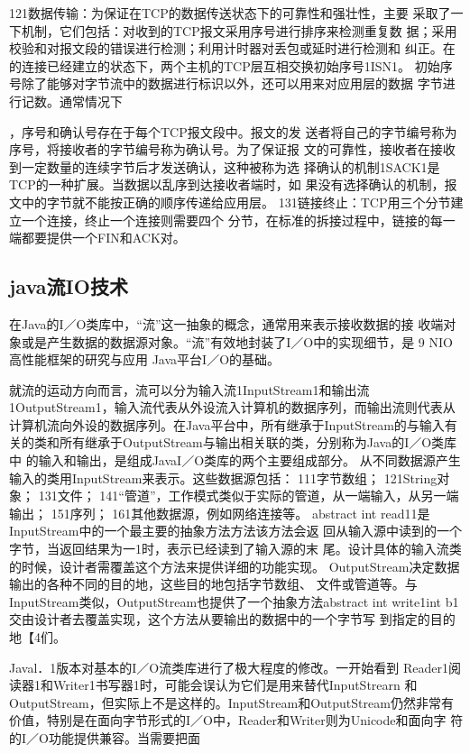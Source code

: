 121数据传输：为保证在TCP的数据传送状态下的可靠性和强壮性，主要
采取了一下机制，它们包括：对收到的TCP报文采用序号进行排序来检测重复数
据；采用校验和对报文段的错误进行检测；利用计时器对丢包或延时进行检测和
纠正。在的连接已经建立的状态下，两个主机的TCP层互相交换初始序号1ISN1。
初始序号除了能够对字节流中的数据进行标识以外，还可以用来对应用层的数据
字节进行记数。通常情况下

，序号和确认号存在于每个TCP报文段中。报文的发
送者将自己的字节编号称为序号，将接收者的字节编号称为确认号。为了保证报
文的可靠性，接收者在接收到一定数量的连续字节后才发送确认，这种被称为选
择确认的机制1SACK1是TCP的一种扩展。当数据以乱序到达接收者端时，如
果没有选择确认的机制，报文中的字节就不能按正确的顺序传递给应用层。
131链接终止：TCP用三个分节建立一个连接，终止一个连接则需要四个
分节，在标准的拆接过程中，链接的每一端都要提供一个FIN和ACK对。
\subsection{java流IO技术}
在Java的I／O类库中，“流”这一抽象的概念，通常用来表示接收数据的接
收端对象或是产生数据的数据源对象。“流”有效地封装了I／O中的实现细节，是
9
NIO高性能框架的研究与应用
Java平台I／O的基础。

就流的运动方向而言，流可以分为输入流1InputStream1和输出流
1OutputStream1，输入流代表从外设流入计算机的数据序列，而输出流则代表从
计算机流向外设的数据序列。在Java平台中，所有继承于InputStream的与输入有
关的类和所有继承于OutputStream与输出相关联的类，分别称为Java的I／O类库中
的输入和输出，是组成JavaI／O类库的两个主要组成部分。
从不同数据源产生输入的类用InputStream来表示。这些数据源包括：
111字节数组；
121String对象；
131文件；
141“管道”，工作模式类似于实际的管道，从一端输入，从另一端输出；
151序列；
161其他数据源，例如网络连接等。
abstract int read11是InputStream中的一个最主要的抽象方法方法该方法会返
回从输入源中读到的一个字节，当返回结果为一1时，表示已经读到了输入源的末
尾。设计具体的输入流类的时候，设计者需覆盖这个方法来提供详细的功能实现。
OutputStream决定数据输出的各种不同的目的地，这些目的地包括字节数组、
文件或管道等。与InputStream类似，OutputStream也提供了一个抽象方法abstract
int write1int b1交由设计者去覆盖实现，这个方法从要输出的数据中的一个字节写
到指定的目的地【4们。

Javal．1版本对基本的I／O流类库进行了极大程度的修改。一开始看到
Reader1阅读器1和Writer1书写器1时，可能会误认为它们是用来替代InputStrearn
和OutputStream，但实际上不是这样的。InputStream和OutputStream仍然非常有
价值，特别是在面向字节形式的I／O中，Reader和Writer则为Unicode和面向字
符的I／O功能提供兼容。当需要把面

